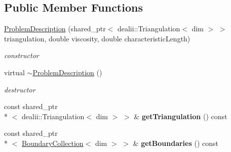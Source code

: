 \subsection*{Public Member Functions}
\begin{DoxyCompactItemize}
\item 
\hyperlink{classnatrium_1_1ProblemDescription_aae378c7eb216b616de56dfcd162c02c2}{Problem\-Description} (shared\-\_\-ptr$<$ dealii\-::\-Triangulation$<$ dim $>$ $>$ triangulation, double viscosity, double characteristic\-Length)
\begin{DoxyCompactList}\small\item\em constructor \end{DoxyCompactList}\item 
\hypertarget{classnatrium_1_1ProblemDescription_a5270994970ddbd9f6fc98f292c1ccc0e}{virtual \hyperlink{classnatrium_1_1ProblemDescription_a5270994970ddbd9f6fc98f292c1ccc0e}{$\sim$\-Problem\-Description} ()}\label{classnatrium_1_1ProblemDescription_a5270994970ddbd9f6fc98f292c1ccc0e}

\begin{DoxyCompactList}\small\item\em destructor \end{DoxyCompactList}\item 
\hypertarget{classnatrium_1_1ProblemDescription_a69d3b6c08733468e6c9c152ce4f83585}{const shared\-\_\-ptr\\*
$<$ dealii\-::\-Triangulation$<$ dim $>$ $>$ \& {\bfseries get\-Triangulation} () const }\label{classnatrium_1_1ProblemDescription_a69d3b6c08733468e6c9c152ce4f83585}

\item 
\hypertarget{classnatrium_1_1ProblemDescription_abb061fe78c8d289fe2a4a9000015d842}{const shared\-\_\-ptr\\*
$<$ \hyperlink{classnatrium_1_1BoundaryCollection}{Boundary\-Collection}$<$ dim $>$ $>$ \& {\bfseries get\-Boundaries} () const }\label{classnatrium_1_1ProblemDescription_abb061fe78c8d289fe2a4a9000015d842}


\end{DoxyCompactItemize}
